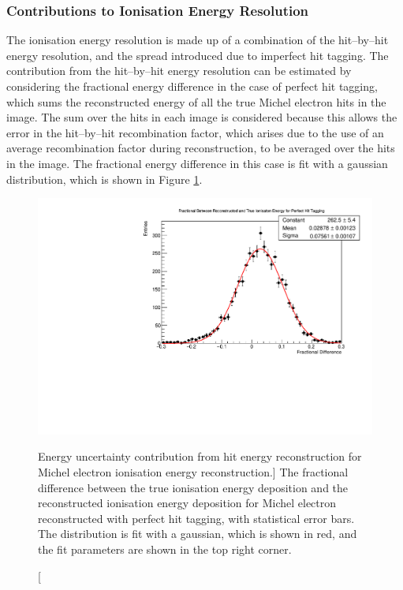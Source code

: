 \subsubsection*{Contributions to Ionisation Energy Resolution}
The ionisation energy resolution is made up of a combination of the hit--by--hit
energy resolution, and the spread introduced due to imperfect hit tagging. The
contribution from the hit--by--hit energy resolution can be estimated by
considering the fractional energy difference in the case of perfect hit tagging,
which sums the reconstructed energy of all the true Michel electron hits in
the image. The sum over the hits in each image is considered because this
allows the error in the hit--by--hit recombination factor, which arises due to
the use of an average recombination factor during reconstruction, to be
averaged over the hits in the image. The fractional energy difference in this
case is fit with a gaussian distribution, which is shown in Figure
\ref{fig:michel_hit_res}.
\begin{figure}
	\centering
	\includegraphics[width=\textwidth]{figures/michel_hit_energy_resolution.pdf}
	\caption
	[Energy uncertainty contribution from hit energy reconstruction for Michel
	electron ionisation energy reconstruction.]
	{The fractional difference between the true ionisation energy deposition and
	the reconstructed ionisation energy deposition for Michel electron
	reconstructed with perfect hit tagging, with statistical error bars. The
	distribution is fit with a gaussian, which is shown in red, and the fit
	parameters are shown in the top right corner.}
	\label{fig:michel_hit_res}
\end{figure}


